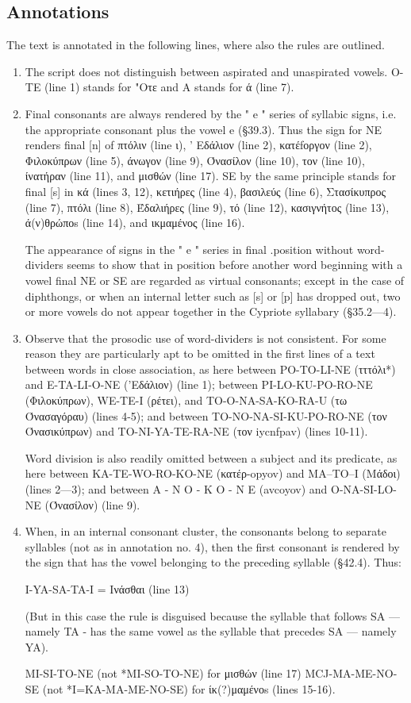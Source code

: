 \subsection{Annotations}

The text is annotated in the following lines, where also the rules are outlined.

\begin{enumerate}
\item The script does not distinguish between aspirated and unaspirated vowels. O-TE (line 1) stands for "Οτε and
A stands for ά (line 7).

\item Final consonants are always rendered by the " e " series of syllabic
signs, i.e. the appropriate consonant plus the vowel e (§39.3). Thus the
sign for NE renders final [n] of πτόλιν (line ι), ' Εδάλιον (line 2),
κατέfοργον (line 2), Φιλοκύπρων (line 5), άνωγον (line 9), Όνασίλον
(line 10), τον (line 10), ίνατήραν (line 11), and μισθών (line 17).
SE by the same principle stands for final [s] in κά (lines 3, 12), κετιήρες
(line 4), βασιλεύς (line 6), Στασίκυπρος (line 7), πτόλι (line 8),
Έδαλιήρες (line 9), τό (line 12), κασιγνήτος (line 13), ά(ν)θρώποs
(line 14), and ικμαμένος (line 16).

The appearance of signs in the " e " series in final .position without
word-dividers seems to show that in position before another word
beginning with a vowel final NE or SE are regarded as virtual
consonants; except in the case of diphthongs, or when an internal letter
such as [s] or [p] has dropped out, two or more vowels do not appear
together in the Cypriote syllabary (§35.2—4).
\item  Observe that the prosodic use of word-dividers is not consistent. For
some reason they are particularly apt to be omitted in the first lines of
a text between words in close association, as here between
PO-TO-LI-NE (τττόλι*) and E-TA-LI-O-NE ('Εδάλιον) (line 1);
between PI-LO-KU-PO-RO-NE (Φιλοκύπρων), WE-TE-I
(ρέτει), and TO-O-NA-SA-KO-RA-U (τω Όνασαγόραυ) (lines
4-5); and between TO-NO-NA-SI-KU-PO-RO-NE (τον
Όνασικύπρων) and TO-NI-YA-TE-RA-NE (τον iycnfpav) (lines
10-11). 

Word division is also readily omitted between a subject and
its predicate, as here between \textsc{KA-TE-WO-RO-KO-NE} (κατέρ-opyov) and MA--TO--Ι (Μάδοι) (lines 2—3); and between
A - N O - K O - N E (avcoyov) and O-NA-SI-LO-NE (Όνασίλον)
(line 9).


\item When, in an internal consonant cluster, the consonants belong to
separate syllables (not as in annotation no. 4), then the first consonant
is rendered by the sign that has the vowel belonging to the preceding
syllable (§42.4). Thus:

I-YA-SA-TA-I = Ινάσθαι (line 13)

(But in this case the rule is disguised because the syllable that follows
SA — namely TA - has the same vowel as the syllable that precedes SA
— namely YA).

MI-SI-TO-NE (not *MI-SO-TO-NE) for μισθών (line 17)
MCJ-MA-ME-NO-SE (not *I=KA-MA-ME-NO-SE) for ίκ(?)μαμένοs (lines
15-16).
\end{enumerate}

